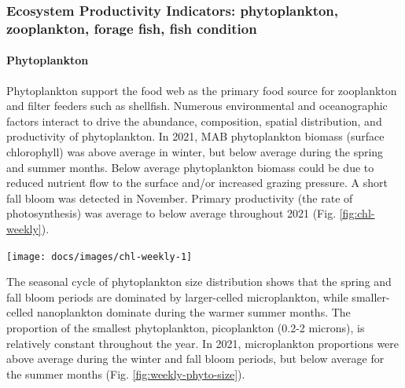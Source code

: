 \documentclass[
  10pt,
]{article}
\let\origfigure\figure
\let\endorigfigure\endfigure
\renewenvironment{figure}[1][2] {
    \expandafter\origfigure\expandafter[H]
} {
    \endorigfigure
}
\begin{document}
\hypertarget{ecosystem-productivity-indicators-phytoplankton-zooplankton-forage-fish-fish-condition}{%
\subsubsection{Ecosystem Productivity Indicators: phytoplankton,
zooplankton, forage fish, fish
condition}\label{ecosystem-productivity-indicators-phytoplankton-zooplankton-forage-fish-fish-condition}}

\hypertarget{phytoplankton}{%
\paragraph{Phytoplankton}\label{phytoplankton}}

Phytoplankton support the food web as the primary food source for
zooplankton and filter feeders such as shellfish. Numerous environmental
and oceanographic factors interact to drive the abundance, composition,
spatial distribution, and productivity of phytoplankton. In 2021, MAB
phytoplankton biomass (surface chlorophyll) was above average in winter,
but below average during the spring and summer months. Below average
phytoplankton biomass could be due to reduced nutrient flow to the
surface and/or increased grazing pressure. A short fall bloom was
detected in November. Primary productivity (the rate of photosynthesis)
was average to below average throughout 2021 (Fig.
\ref{fig:chl-weekly}).

\begin{figure}

{\centering \texttt{[image: docs/images/chl-weekly-1]} 

}

\caption{Weekly chlorophyll concentrations and primary productivity in the Mid-Atlantic are shown by the colored line for 2021 (dashed portion indicates preliminary data from a near real-time satellite source). The long-term mean is shown in black and shading indicates +/- 1 standard deviation.}\label{fig:chl-weekly}
\end{figure}

The seasonal cycle of phytoplankton size distribution shows that the
spring and fall bloom periods are dominated by larger-celled
microplankton, while smaller-celled nanoplankton dominate during the
warmer summer months. The proportion of the smallest phytoplankton,
picoplankton (0.2-2 microns), is relatively constant throughout the
year. In 2021, microplankton proportions were above average during the
winter and fall bloom periods, but below average for the summer months
(Fig. \ref{fig:weekly-phyto-size}).
\end{document}
